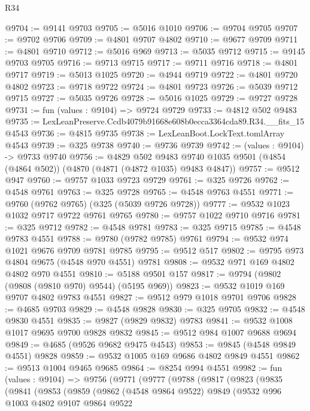\begin{lexlean}{R34}
\begin{coremodule}
@9704 := @9141 @9703
@9705 := @5016 @1010
@9706 := @9704 @9705
@9707 := @9702 @9706
@9709 := @4801 @9707 @4802
@9710 := @9677 @9709
@9711 := @4801 @9710
@9712 := @5016 @969
@9713 := @5035 @9712
@9715 := @9145 @9703 @9705
@9716 := @9713 @9715
@9717 := @9711 @9716
@9718 := @4801 @9717
@9719 := @5013 @1025
@9720 := @4944 @9719
@9722 := @4801 @9720 @4802
@9723 := @9718 @9722
@9724 := @4801 @9723
@9726 := @5039 @9712 @9715
@9727 := @5035 @9726
@9728 := @5016 @1025
@9729 := @9727 @9728
@9731 := fun (values : @9104) => @9724 @9729
@9733 := @4812 @502 @9483
@9735 := LexLeanPreserve.Ccdb4079b91668e608b0ecca3364cda89.R34.__fits_15 @4543
@9736 := @4815 @9735
@9738 := LexLeanBoot.LockText.tomlArray @4543
@9739 := @325 @9738
@9740 := @9736 @9739
@9742 := (values : @9104) -> @9733 @9740
@9756 := @4829
    @502
    @9483
    @9740
    @1035
    @9501
    (@4854 (@4864 @502))
    (@4870 (@4871 (@4872 @1035) @9483 @4847))
@9757 := @9512 @947
@9760 := @9757 @1033 @9723 @9729
@9761 := @325 @9726
@9762 := @4548 @9761
@9763 := @325 @9728
@9765 := @4548 @9763 @4551
@9771 := @9760 (@9762 @9765) (@325 (@5039 @9726 @9728))
@9777 := @9532 @1023 @1032 @9717 @9722 @9761 @9765
@9780 := @9757 @1022 @9710 @9716
@9781 := @325 @9712
@9782 := @4548 @9781
@9783 := @325 @9715
@9785 := @4548 @9783 @4551
@9788 := @9780 (@9782 @9785) @9761
@9794 := @9532 @974 @1021 @9676 @9709 @9781 @9785
@9795 := @9512 @517
@9802 := @9795 @973 @4804 @9675 (@4548 @970 @4551) @9781
@9808 := @9532 @971 @169 @4802 @4802 @970 @4551
@9810 := @5188 @9501 @157
@9817 := @9794 (@9802 (@9808 (@9810 @970) @9544) (@5195 @969))
@9823 := @9532 @1019 @169 @9707 @4802 @9783 @4551
@9827 := @9512 @979 @1018 @9701 @9706
@9828 := @4685 @9703
@9829 := @4548 @9828
@9830 := @325 @9705
@9832 := @4548 @9830 @4551
@9835 := @9827 (@9829 @9832) @9783
@9841 := @9532 @1008 @1017 @9695 @9700 @9828 @9832
@9845 := @9512 @984 @1007 @9688 @9694
@9849 := @4685 (@9526 @9682 @9475 @4543)
@9853 := @9845 (@4548 @9849 @4551) @9828
@9859 := @9532 @1005 @169 @9686 @4802 @9849 @4551
@9862 := @9513 @1004 @9465 @9685
@9864 := @8254 @994 @4551
@9982 := fun (values : @9104) =>
  @9756
    (@9771
      (@9777
        (@9788
          (@9817
            (@9823
              (@9835
                (@9841
                  (@9853
                    (@9859
                      (@9862
                        (@4548 @9864 @9522)
                        @9849
                        (@9532
                          @996
                          @1003
                          @4802
                          @9107
                          @9864
                          @9522

\end{coremodule}
\end{lexlean}
